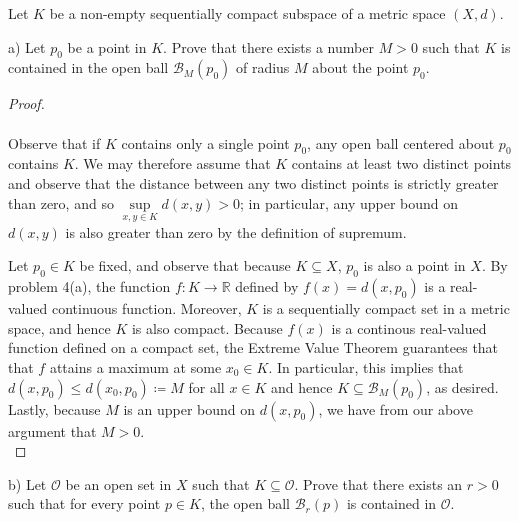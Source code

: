 Let $K$ be a non-empty sequentially compact subspace of a metric space $(X, d)$.

a) Let $p_0$ be a point in $K$. Prove that there exists a number $M > 0$ such that $K$ is contained in the open ball
   $\mathcal{B}_M(p_0)$ of radius $M$ about the point $p_0$. 

\begin{proof}\ \\\\
   Observe that if $K$ contains only a single point $p_0$, any open ball centered about $p_0$ contains $K$. We may
   therefore assume that $K$ contains at least two distinct points and observe that the distance between any two 
   distinct points is strictly greater than zero, and so $\sup\limits_{x, y \in K}{d(x, y)} > 0$; in particular, any 
   upper bound on $d(x, y)$ is also greater than zero by the definition of supremum.

   Let $p_0 \in K$ be fixed, and observe that because $K \subseteq X$, $p_0$ is also a point in $X$. By problem 4(a),
   the function $f:K \to \mathbb{R}$ defined by $f(x) = d(x, p_0)$ is a real-valued continuous function. Moreover, 
   $K$ is a sequentially compact set in a metric space, and hence $K$ is also compact. Because $f(x)$ is a continous
   real-valued function defined on a compact set, the Extreme Value Theorem guarantees that that $f$ attains a maximum
   at some $x_0 \in K$. In particular, this implies that $d(x, p_0) \le d(x_0, p_0) \coloneqq M$ for all $x \in K$
   and hence $K \subseteq \mathcal{B}_{M}(p_0)$, as desired. Lastly, because $M$ is an upper bound on $d(x, p_0)$, we
   have from our above argument that $M > 0$.
   \ \\
\end{proof}

\pagebreak

b) Let $\mathcal{O}$ be an open set in $X$ such that $K \subseteq \mathcal{O}$. Prove that there exists an $r > 0$ such
   that for every point $p \in K$, the open ball $\mathcal{B}_r(p)$ is contained in $\mathcal{O}$.

